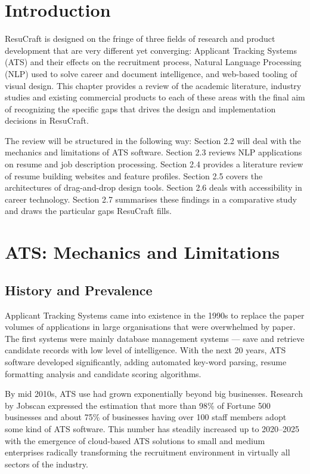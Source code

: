 \documentclass[12pt, a4paper, oneside]{report}
\begin{document}
\section{Introduction}

ResuCraft is designed on the fringe of three fields of research and product development that are very different yet converging: Applicant Tracking Systems (ATS) and their effects on the recruitment process, Natural Language Processing (NLP) used to solve career and document intelligence, and web-based tooling of visual design. This chapter provides a review of the academic literature, industry studies and existing commercial products to each of these areas with the final aim of recognizing the specific gaps that drives the design and implementation decisions in ResuCraft.

The review will be structured in the following way: Section 2.2 will deal with the mechanics and limitations of ATS software. Section 2.3 reviews NLP applications on resume and job description processing. Section 2.4 provides a literature review of resume building websites and feature profiles. Section 2.5 covers the architectures of drag-and-drop design tools. Section 2.6 deals with accessibility in career technology. Section 2.7 summarises these findings in a comparative study and draws the particular gaps ResuCraft fills.

\section{ATS: Mechanics and Limitations}

\subsection{History and Prevalence}

Applicant Tracking Systems came into existence in the 1990s to replace the paper volumes of applications in large organisations that were overwhelmed by paper. The first systems were mainly database management systems --- save and retrieve candidate records with low level of intelligence. With the next 20 years, ATS software developed significantly, adding automated key-word parsing, resume formatting analysis and candidate scoring algorithms.

By mid 2010s, ATS use had grown exponentially beyond big businesses. Research by Jobscan\cite{jobscan2021} expressed the estimation that more than 98\% of Fortune 500 businesses and about 75\% of businesses having over 100 staff members adopt some kind of ATS software. This number has steadily increased up to 2020--2025 with the emergence of cloud-based ATS solutions to small and medium enterprises radically transforming the recruitment environment in virtually all sectors of the industry.
\end{document}
